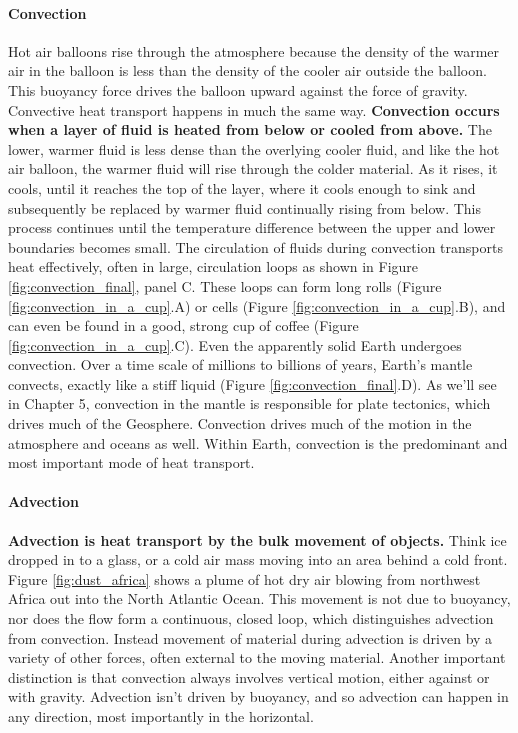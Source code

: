\paragraph{Convection}
Hot air balloons rise through the atmosphere because the density of the warmer air in the balloon is less than the density of the cooler air outside the balloon. This buoyancy force drives the balloon upward against the force of gravity. Convective heat transport happens in much the same way. \textbf{Convection occurs when a layer of fluid is heated from below or cooled from above.} The lower, warmer fluid is less dense than the overlying cooler fluid, and like the hot air balloon, the warmer fluid will rise through the colder material. As it rises, it cools, until it reaches the top of the layer, where it cools enough to sink and subsequently be replaced by warmer fluid continually rising from below. This process continues until the temperature difference between the upper and lower boundaries becomes small. The circulation of fluids during convection transports heat effectively, often in large, circulation loops as shown in Figure \ref{fig:convection_final}, panel C. These loops can form long rolls (Figure \ref{fig:convection_in_a_cup}.A) or cells (Figure \ref{fig:convection_in_a_cup}.B), and can even be found in a good, strong cup of coffee (Figure \ref{fig:convection_in_a_cup}.C). Even the apparently solid Earth undergoes convection. Over a time scale of millions to billions of years, Earth's mantle convects, exactly like a stiff liquid (Figure \ref{fig:convection_final}.D). As we'll see in Chapter 5, convection in the mantle is responsible for plate tectonics, which drives much of the Geosphere. Convection drives much of the motion in the atmosphere and oceans as well. Within Earth, convection is the predominant and most important mode of heat transport.

\paragraph{Advection}
\textbf{Advection is heat transport by the bulk movement of objects.} Think ice dropped in to a glass, or a cold air mass moving into an area behind a cold front. Figure \ref{fig:dust_africa} shows a plume of hot dry air blowing from northwest Africa out into the North Atlantic Ocean. This movement is not due to buoyancy, nor does the flow form a continuous, closed loop, which distinguishes advection from convection. Instead movement of material during advection is driven by a variety of other forces, often external to the moving material. Another important distinction is that convection always involves vertical motion, either against or with gravity. Advection isn't driven by buoyancy, and so advection can happen in any direction, most importantly in the horizontal.

